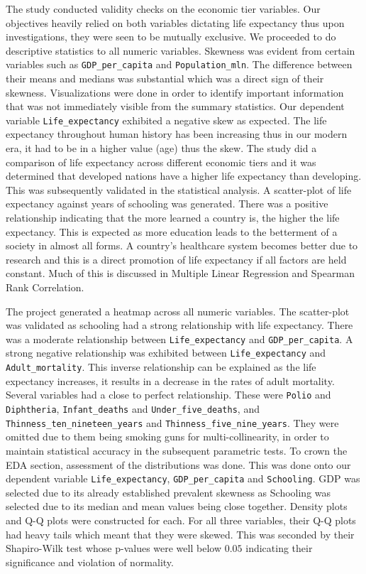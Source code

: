\documentclass[3pt, a4paper]{article}
\begin{document}
The study conducted validity checks on the economic tier variables. Our objectives heavily relied on both variables dictating life expectancy thus upon investigations, they were seen to be mutually exclusive. We proceeded to do descriptive statistics to all numeric variables. Skewness was evident from certain variables such as \texttt{GDP\_per\_capita} and \texttt{Population\_mln}. The difference between their means and medians was substantial which was a direct sign of their skewness. Visualizations were done in order to identify important information that was not immediately visible from the summary statistics. Our dependent variable \texttt{Life\_expectancy} exhibited a negative skew as expected. The life expectancy throughout human history has been increasing thus in our modern era, it had to be in a higher value (age) thus the skew. The study did a comparison of life expectancy across different economic tiers and it was determined that developed nations have a higher life expectancy than developing. This was subsequently validated in the statistical analysis. A scatter-plot of life expectancy against years of schooling was generated. There was a positive relationship indicating that the more learned a country is, the higher the life expectancy. This is expected as more education leads to the betterment of a society in almost all forms. A country's healthcare system becomes better due to research and this is a direct promotion of life expectancy if all factors are held constant. Much of this is discussed in Multiple Linear Regression and Spearman Rank Correlation. 

The project generated a heatmap across all numeric variables. The scatter-plot was validated as schooling had a strong relationship with life expectancy. There was a moderate relationship between \texttt{Life\_expectancy} and \texttt{GDP\_per\_capita}. A strong negative relationship was exhibited between \texttt{Life\_expectancy} and \texttt{Adult\_mortality}. This inverse relationship can be explained as the life expectancy increases, it results in a decrease in the rates of adult mortality. Several variables had a close to perfect relationship. These were \texttt{Polio} and  \texttt{Diphtheria}, \texttt{Infant\_deaths} and \texttt{Under\_five\_deaths}, and \texttt{Thinness\_ten\_nineteen\_years} and \texttt{Thinness\_five\_nine\_years}. They were omitted due to them being smoking guns for multi-collinearity, in order to maintain statistical accuracy in the subsequent parametric tests. To crown the EDA section, assessment of the distributions was done. This was done onto our dependent variable \texttt{Life\_expectancy}, \texttt{GDP\_per\_capita} and \texttt{Schooling}. GDP was selected due to its already established prevalent skewness as Schooling was selected due to its median and mean values being close together. Density plots and Q-Q plots were constructed for each. For all three variables, their Q-Q plots had heavy tails which meant that they were skewed. This was seconded by their Shapiro-Wilk test whose p-values were well below $0.05$ indicating their significance and violation of normality. 
\end{document}
